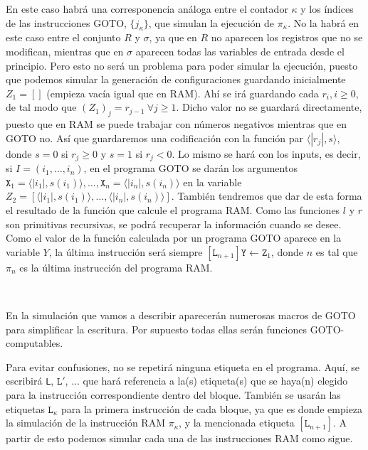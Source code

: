 \documentclass[twoside]{article}
\begin{document}
En este caso habrá una corresponencia análoga entre el contador $\kappa$ y los índices de las instrucciones GOTO, $\{j_\kappa\}$, que simulan la ejecución de $\pi_\kappa$. No la habrá en este caso entre el conjunto $R$ y $\sigma$, ya que en $R$ no aparecen los registros que no se modifican, mientras que en $\sigma$ aparecen todas las variables de entrada desde el principio. Pero esto no será un problema para poder simular la ejecución, puesto que podemos simular la generación de configuraciones guardando inicialmente $Z_1=[]$ (empieza vacía igual que en RAM). Ahí se irá guardando cada $r_i, i\geq 0$, de tal modo que $(Z_1)_j=r_{j-1}\ \forall j\geq 1$. Dicho valor no se guardará directamente, puesto que en RAM se puede trabajar con números negativos mientras que en GOTO no. Así que guardaremos una codificación con la función par $\langle |r_j|,s\rangle$, donde $s=0$ si $r_j\geq 0$ y $s=1$ si $r_j< 0$. Lo mismo se hará con los inputs, es decir, si $I=(i_1,\dots, i_n)$, en el programa GOTO se darán los argumentos $\texttt{X}_1=\langle |i_1|,s(i_1)\rangle,\dots,\texttt{X}_n=\langle |i_n|,s(i_n)\rangle$ en la variable $Z_2=[\langle |i_1|,s(i_1)\rangle,\dots,\langle |i_n|,s(i_n)\rangle]$. También tendremos que dar de esta forma el resultado de la función que calcule el programa RAM. Como las funciones $l$ y $r$ son primitivas recursivas, se podrá recuperar la información cuando se desee. Como el valor de la función calculada por un programa GOTO aparece en la variable $Y$, la última instrucción será siempre $[\texttt{L}_{n+1}]\texttt{Y}\leftarrow\texttt{Z}_1$, donde $n$ es tal que $\pi_n$ es la última instrucción del programa RAM.

\

En la simulación que vamos a describir aparecerán numerosas macros de GOTO para simplificar la escritura. Por supuesto todas ellas serán funciones GOTO-computables. 

Para evitar confusiones, no se repetirá ninguna etiqueta en el programa. Aquí, se escribirá \texttt{L}, $\texttt{L}'$, ... que hará referencia a la(s) etiqueta(s) que se haya(n) elegido para la instrucción correspondiente dentro del bloque. También se usarán las etiquetas $\texttt{L}_\kappa$ para la primera instrucción de cada bloque, ya que es donde empieza la simulación de la instrucción RAM $\pi_\kappa$, y la mencionada etiqueta $[\texttt{L}_{n+1}]$. A partir de esto podemos simular cada una de las instrucciones RAM como sigue. 
\end{document}
